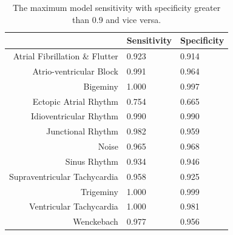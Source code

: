 \begin{table}
\centering
\begin{tabular}{r l l}
\toprule
             & Sensitivity       & Specificity  \\
\midrule
Atrial Fibrillation \& Flutter & 0.923 & 0.914 \\
Atrio-ventricular Block        & 0.991 & 0.964 \\
Bigeminy                       & 1.000 & 0.997 \\
Ectopic Atrial Rhythm          & 0.754 & 0.665 \\
Idioventricular Rhythm         & 0.990 & 0.990 \\
Junctional Rhythm              & 0.982 & 0.959 \\
Noise                          & 0.965 & 0.968 \\
Sinus Rhythm                   & 0.934 & 0.946 \\
Supraventricular Tachycardia   & 0.958 & 0.925 \\
Trigeminy                      & 1.000 & 0.999 \\
Ventricular Tachycardia        & 1.000 & 0.981 \\
Wenckebach                     & 0.977 & 0.956 \\
\bottomrule
\end{tabular}
\caption{The maximum model sensitivity with specificity greater than 0.9 and
         vice versa.}
\label{tab:arrhythmias:sens_spec}
\end{table}

